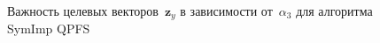 \documentclass[preprint,12pt]{elsarticle}
\theoremstyle{definition}
\newcommand{\bz}{\mathbf{z}}
\begin{document}
\begin{figure}[h]
	\begin{minipage}{.5\linewidth}
	\end{minipage}%
	\begin{minipage}{.5\linewidth}
	\end{minipage}\par\medskip
	
	\caption{Важность целевых векторов~$\bz_y$ в зависимости от~$\alpha_3$ для алгоритма SymImp QPFS}
	\label{fig:features_vs_alpha_ecog}
\end{figure}
\end{document}
